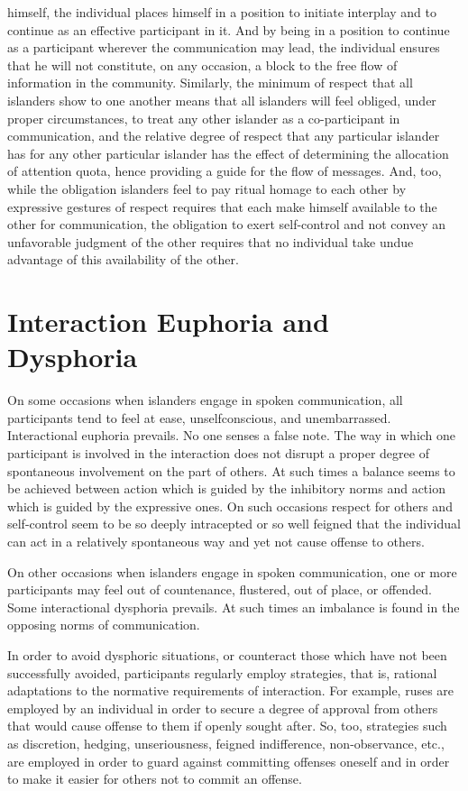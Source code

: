 \documentclass[twoside,symmetric,nobib,justified]{tufte-book}
\begin{document}
himself, the individual places himself in a position to initiate
interplay and to continue as an effective participant in it. And by
being in a position to continue as a participant wherever the
communication may lead, the individual ensures that he will not
constitute, on any occasion, a block to the free flow of information in
the community. Similarly, the minimum of respect that all islanders show
to one another means that all islanders will feel obliged, under proper
circumstances, to treat any other islander as a co-participant in
communication, and the relative degree of respect that any particular
islander has for any other particular islander has the effect of
determining the allocation of attention quota, hence providing a guide
for the flow of messages. And, too, while the obligation islanders feel
to pay ritual homage to each other by expressive gestures of respect
requires that each make himself available to the other for
communication, the obligation to exert self-control and not convey an
unfavorable judgment of the other requires that no individual take undue
advantage of this availability of the other.

\hypertarget{interaction-euphoria-and-dysphoria}{%
\section{Interaction Euphoria and
Dysphoria}\label{interaction-euphoria-and-dysphoria}}

On some occasions when islanders engage in spoken communication, all
participants tend to feel at ease, unselfconscious, and unembarrassed.
Interactional euphoria prevails. No one senses a false note. The way in
which one participant is involved in the interaction does not disrupt a
proper degree of spontaneous involvement on the part of others. At such
times a balance seems to be achieved between action which is guided by
the inhibitory norms and action which is guided by the expressive ones.
On such occasions respect for others and self-control seem to be so
deeply intracepted or so well feigned that the individual can act in a
relatively spontaneous way and yet not cause offense to others.

On other occasions when islanders engage in spoken communication, one or
more participants may feel out of countenance, flustered, out of place,
or offended. Some interactional dysphoria prevails. At such times an
imbalance is found in the opposing norms of communication.

In order to avoid dysphoric situations, or counteract those which have
not been successfully avoided, participants regularly employ strategies,
that is, rational adaptations to the normative requirements of
interaction. For example, ruses are employed by an individual in order
to secure a degree of approval from others that would cause offense to
them if openly sought after. So, too, strategies such as discretion,
hedging, unseriousness, feigned indifference, non-observance, etc., are
employed in order to guard against committing offenses oneself and in
order to make it easier for others not to commit an offense.
\end{document}
